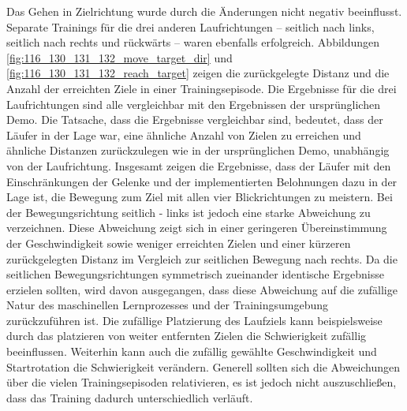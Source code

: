 Das Gehen in Zielrichtung wurde durch die Änderungen nicht negativ beeinflusst. Separate Trainings für die drei anderen Laufrichtungen – seitlich nach links, seitlich nach rechts und rückwärts – waren ebenfalls erfolgreich. Abbildungen \ref{fig:116_130_131_132_move_target_dir} und \ref{fig:116_130_131_132_reach_target} zeigen die zurückgelegte Distanz und die Anzahl der erreichten Ziele in einer Trainingsepisode. Die Ergebnisse für die drei Laufrichtungen sind alle vergleichbar mit den Ergebnissen der ursprünglichen Demo. Die Tatsache, dass die Ergebnisse  \grqq{}vergleichbar \grqq{} sind, bedeutet, dass der Läufer in der Lage war, eine ähnliche Anzahl von Zielen zu erreichen und ähnliche Distanzen zurückzulegen wie in der ursprünglichen Demo, unabhängig von der Laufrichtung. Insgesamt zeigen die Ergebnisse, dass der Läufer mit den Einschränkungen der Gelenke und der implementierten Belohnungen dazu in der Lage ist, die Bewegung zum Ziel mit allen vier Blickrichtungen zu meistern. Bei der Bewegungsrichtung seitlich - links ist jedoch eine starke Abweichung zu verzeichnen. Diese Abweichung zeigt sich in einer geringeren Übereinstimmung der Geschwindigkeit sowie weniger erreichten Zielen und einer kürzeren zurückgelegten Distanz im Vergleich zur seitlichen Bewegung nach rechts. Da die seitlichen Bewegungsrichtungen symmetrisch zueinander identische Ergebnisse erzielen sollten, wird davon ausgegangen, dass diese Abweichung auf die zufällige Natur des maschinellen Lernprozesses und der Trainingsumgebung zurückzuführen ist. Die zufällige Platzierung des Laufziels kann beispielsweise durch das platzieren von weiter entfernten Zielen die Schwierigkeit zufällig beeinflussen. Weiterhin kann auch die zufällig gewählte Geschwindigkeit und Startrotation die Schwierigkeit verändern. Generell sollten sich die Abweichungen über die vielen Trainingsepisoden relativieren, es ist jedoch nicht auszuschließen, dass das Training dadurch unterschiedlich verläuft.

